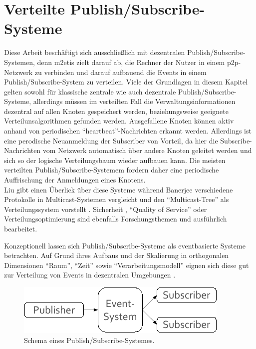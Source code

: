\section{Verteilte Publish/Subscribe-Systeme}
\label{chap:grundlagen:pubsub}
Diese Arbeit beschäftigt sich ausschließlich mit dezentralen Publish/Subscribe-Sys\-temen, denn \ac{m2etis} zielt darauf ab, die Rechner der Nutzer in einem p2p-Netzwerk zu verbinden und darauf aufbauend die Events in einem Publish/Subscribe-System zu verteilen. Viele der Grundlagen in diesem Kapitel gelten sowohl für klassische zentrale wie auch dezentrale Publish/Subscribe-Systeme, allerdings müssen im verteilten Fall die Verwaltungsinformationen dezentral auf allen Knoten gespeichert werden, beziehungsweise geeignete Verteilunsalgorithmen gefunden werden. Ausgefallene Knoten können aktiv anhand von periodischen ``heartbeat''-Nachrichten erkannt werden. Allerdings ist eine perodische Neuanmeldung der Subscriber von Vorteil, da hier die Subscribe-Nachrichten vom Netzwerk automatisch über andere Knoten geleitet werden und sich so der logische Verteilungsbaum wieder aufbauen kann. Die meisten verteilten Publish/Subscribe-Systemem fordern daher eine periodische Auffrischung der Anmeldungen eines Knotens.\\
Liu gibt einen Überlick über diese Systeme \cite{Liu2003Survey} während Banerjee verschiedene Protokolle in Multicast-Systemen vergleicht und den ``Multicast-Tree'' als Verteilungssystem vorstellt \cite{Banerjee2001Comparative}. Sicherheit \cite{FiegeSecurity}, ``Quality of Service'' \cite{BeFiMu2006PubSubQoS} oder Verteilungsoptimierung \cite{Muhl2002LargeScale} sind ebenfalls Forschungsthemen und ausführlich bearbeitet.

Konzeptionell lassen sich Publish/Subscribe-Systeme als eventbasierte Systeme betrachten. Auf Grund ihres Aufbaus und der Skalierung  in orthogonalen Dimensionen ``Raum'', ``Zeit'' sowie ``Verarbeitungsmodell'' eignen sich diese gut zur Verteilung von Events in dezentralen Umgebungen \cite{PatrickTh2003Many, Cugola2002Using}.

\begin{figure}[htbp]
\centering
\includegraphics{grafics/pubsub_black_box.pdf}
\caption{Schema eines Publish/Subscribe-Systemes.}
\label{fig:pubsub_black_box}
\end{figure}


